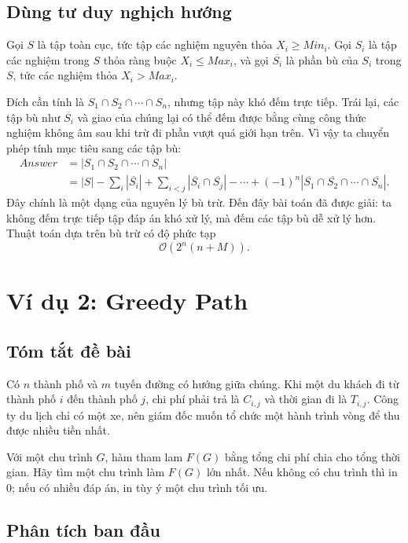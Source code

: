 \documentclass[11pt]{article}
\newcommand{\Oh}{\mathcal{O}}
\begin{document}
\subsection{Dùng tư duy nghịch hướng}

Gọi $S$ là tập toàn cục, tức tập các nghiệm nguyên thỏa $X_i\ge \mathit{Min}_i$.
Gọi $S_i$ là tập các nghiệm trong $S$ thỏa ràng buộc
$X_i\le \mathit{Max}_i$, và gọi $\overline{S_i}$ là phần bù của $S_i$ trong
$S$, tức các nghiệm thỏa $X_i>\mathit{Max}_i$.

Đích cần tính là $S_1\cap S_2\cap\cdots\cap S_n$, nhưng tập này khó đếm trực
tiếp. Trái lại, các tập bù như $\overline{S_i}$ và giao của chúng lại có thể
đếm được bằng cùng công thức nghiệm không âm sau khi trừ đi phần vượt quá
giới hạn trên. Vì vậy ta chuyển phép tính mục tiêu sang các tập bù:
\[
\begin{aligned}
\mathit{Answer}
&= |S_1\cap S_2\cap\cdots\cap S_n|\\
&= |S|
 - \sum_i |\overline{S_i}|
 + \sum_{i<j} |\overline{S_i}\cap\overline{S_j}|
 - \cdots
 + (-1)^n |\overline{S_1}\cap\overline{S_2}\cap\cdots\cap\overline{S_n}|.
\end{aligned}
\]
Đây chính là một dạng của nguyên lý bù trừ. Đến đây bài toán đã được giải:
ta không đếm trực tiếp tập đáp án khó xử lý, mà đếm các tập bù dễ xử lý hơn.
Thuật toán dựa trên bù trừ có độ phức tạp
\[
  \Oh(2^n(n+M)).
\]

\section{Ví dụ 2: Greedy Path}

\subsection{Tóm tắt đề bài}

Có $n$ thành phố và $m$ tuyến đường có hướng giữa chúng. Khi một du khách đi
từ thành phố $i$ đến thành phố $j$, chi phí phải trả là $C_{i,j}$ và thời
gian đi là $T_{i,j}$. Công ty du lịch chỉ có một xe, nên giám đốc muốn tổ
chức một hành trình vòng để thu được nhiều tiền nhất.

Với một chu trình $G$, hàm tham lam $F(G)$ bằng tổng chi phí chia cho tổng
thời gian. Hãy tìm một chu trình làm $F(G)$ lớn nhất. Nếu không có chu trình
thì in $0$; nếu có nhiều đáp án, in tùy ý một chu trình tối ưu.

\subsection{Phân tích ban đầu}
\end{document}
